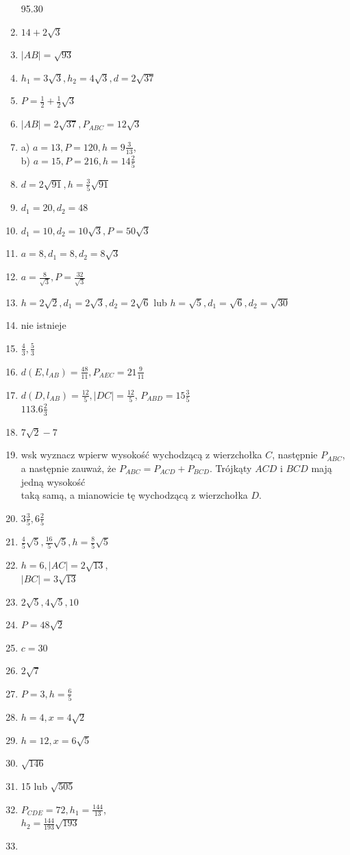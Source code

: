 \documentclass[10pt]{article}
\begin{document}
\begin{enumerate}
95.30
  \item \(14+2 \sqrt{3}\)
  \item \(|A B|=\sqrt{93}\)
  \item \(h_{1}=3 \sqrt{3}, h_{2}=4 \sqrt{3}, d=2 \sqrt{37}\)
  \item \(P=\frac{1}{2}+\frac{1}{2} \sqrt{3}\)
  \item \(|A B|=2 \sqrt{37}, P_{A B C}=12 \sqrt{3}\)
  \item a) \(a=13, P=120, h=9 \frac{3}{13}\),\\
b) \(a=15, P=216, h=14 \frac{2}{5}\)
  \item \(d=2 \sqrt{91}, h=\frac{3}{5} \sqrt{91}\)
  \item \(d_{1}=20, d_{2}=48\)
  \item \(d_{1}=10, d_{2}=10 \sqrt{3}, P=50 \sqrt{3}\)
  \item \(a=8, d_{1}=8, d_{2}=8 \sqrt{3}\)
  \item \(a=\frac{8}{\sqrt{3}}, P=\frac{32}{\sqrt{3}}\)
  \item \(h=2 \sqrt{2}, d_{1}=2 \sqrt{3}, d_{2}=2 \sqrt{6}\) lub \(h=\sqrt{5}, d_{1}=\sqrt{6}, d_{2}=\sqrt{30}\)
  \item nie istnieje
  \item \(\frac{4}{3}, \frac{5}{3}\)
  \item \(d\left(E, l_{A B}\right)=\frac{48}{11}, P_{A E C}=21 \frac{9}{11}\)
  \item \(d\left(D, l_{A B}\right)=\frac{12}{5},|D C|=\frac{12}{5}\), \(P_{A B D}=15 \frac{3}{5}\)\\
\(113.6 \frac{2}{3}\)
  \item \(7 \sqrt{2}-7\)
  \item wsk wyznacz wpierw wysokość wychodzącą z wierzchołka \(C\), następnie \(P_{A B C}\), a następnie zauważ, że \(P_{A B C}=P_{A C D}+P_{B C D}\). Trójkąty \(A C D\) i \(B C D\) mają jedną wysokość\\
taką samą, a mianowicie tę wychodzącą z wierzchołka \(D\).
  \item \(3 \frac{3}{5}, 6 \frac{2}{5}\)
  \item \(\frac{4}{5} \sqrt{5}, \frac{16}{5} \sqrt{5}, h=\frac{8}{5} \sqrt{5}\)
  \item \(h=6,|A C|=2 \sqrt{13}\),\\
\(|B C|=3 \sqrt{13}\)
  \item \(2 \sqrt{5}, 4 \sqrt{5}, 10\)
  \item \(P=48 \sqrt{2}\)
  \item \(c=30\)
  \item \(2 \sqrt{7}\)
  \item \(P=3, h=\frac{6}{5}\)
  \item \(h=4, x=4 \sqrt{2}\)
  \item \(h=12, x=6 \sqrt{5}\)
  \item \(\sqrt{146}\)
  \item 15 lub \(\sqrt{505}\)
  \item \(P_{C D E}=72, h_{1}=\frac{144}{13}\),\\
\(h_{2}=\frac{144}{193} \sqrt{193}\)
  \item 
\end{enumerate}
\end{document}
